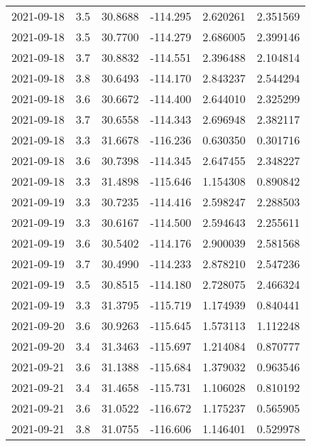 \begin{tabular}{lrrrrr}
2021-09-18 &       3.5 &  30.8688 &  -114.295 &         2.620261 &         2.351569 \\
2021-09-18 &       3.5 &  30.7700 &  -114.279 &         2.686005 &         2.399146 \\
2021-09-18 &       3.7 &  30.8832 &  -114.551 &         2.396488 &         2.104814 \\
2021-09-18 &       3.8 &  30.6493 &  -114.170 &         2.843237 &         2.544294 \\
2021-09-18 &       3.6 &  30.6672 &  -114.400 &         2.644010 &         2.325299 \\
2021-09-18 &       3.7 &  30.6558 &  -114.343 &         2.696948 &         2.382117 \\
2021-09-18 &       3.3 &  31.6678 &  -116.236 &         0.630350 &         0.301716 \\
2021-09-18 &       3.6 &  30.7398 &  -114.345 &         2.647455 &         2.348227 \\
2021-09-18 &       3.3 &  31.4898 &  -115.646 &         1.154308 &         0.890842 \\
2021-09-19 &       3.3 &  30.7235 &  -114.416 &         2.598247 &         2.288503 \\
2021-09-19 &       3.3 &  30.6167 &  -114.500 &         2.594643 &         2.255611 \\
2021-09-19 &       3.6 &  30.5402 &  -114.176 &         2.900039 &         2.581568 \\
2021-09-19 &       3.7 &  30.4990 &  -114.233 &         2.878210 &         2.547236 \\
2021-09-19 &       3.5 &  30.8515 &  -114.180 &         2.728075 &         2.466324 \\
2021-09-19 &       3.3 &  31.3795 &  -115.719 &         1.174939 &         0.840441 \\
2021-09-20 &       3.6 &  30.9263 &  -115.645 &         1.573113 &         1.112248 \\
2021-09-20 &       3.4 &  31.3463 &  -115.697 &         1.214084 &         0.870777 \\
2021-09-21 &       3.6 &  31.1388 &  -115.684 &         1.379032 &         0.963546 \\
2021-09-21 &       3.4 &  31.4658 &  -115.731 &         1.106028 &         0.810192 \\
2021-09-21 &       3.6 &  31.0522 &  -116.672 &         1.175237 &         0.565905 \\
2021-09-21 &       3.8 &  31.0755 &  -116.606 &         1.146401 &         0.529978 \\

\end{tabular}
